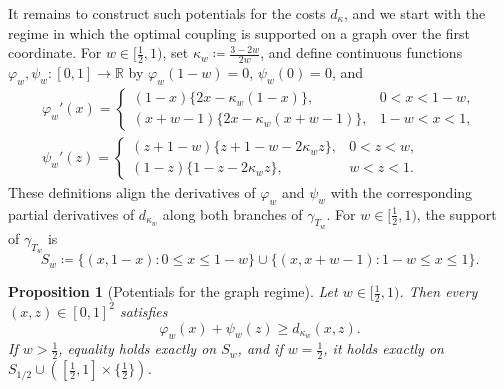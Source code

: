 \documentclass[11pt,a4paper]{article}
\newtheorem{proposition}[theorem]{Proposition}
\theoremstyle{remark}
\newcommand{\R}{\mathbb{R}}
\newcommand{\1}{\mathbf{1}}
\begin{document}
It remains to construct such potentials for the costs $d_\kappa$, and we start with the regime in which the optimal coupling is supported on a graph over the first coordinate.
For $w\in[\frac12,1)$, set $\kappa_w\coloneqq\frac{3-2w}{2w}$, and define continuous functions $\varphi_w,\psi_w:[0,1]\to\R$ by $\varphi_w(1-w)=0$, $\psi_w(0)=0$, and
\begin{equation}
  \label{eq:potential-A}
  \begin{gathered}
  \varphi_w'(x)=
  \begin{cases}
    (1-x)\bigl\{2x-\kappa_w(1-x)\bigr\}, & 0<x<1-w,\\
    (x+w-1)\bigl\{2x-\kappa_w(x+w-1)\bigr\}, & 1-w<x<1,
  \end{cases}\\[0.5ex]
  \psi_w'(z)=
  \begin{cases}
    (z+1-w)\bigl\{z+1-w-2\kappa_wz\bigr\}, & 0<z<w,\\
    (1-z)\bigl\{1-z-2\kappa_wz\bigr\}, & w<z<1.
  \end{cases}
  \end{gathered}
\end{equation}
These definitions align the derivatives of $\varphi_w$ and $\psi_w$ with the corresponding partial derivatives of $d_{\kappa_w}$ along both branches of $\gamma_{T_w}$.
For $w\in[\frac12,1)$, the support of $\gamma_{T_w}$ is
\[
  S_w\coloneqq\{(x,1-x):0\le x\le1-w\}
       \cup\{(x,x+w-1):1-w\le x\le1\}.
\]

\begin{proposition}[Potentials for the graph regime]
\label{prop:dual-A}
Let $w\in[\frac12,1)$.
Then every $(x,z)\in[0,1]^2$ satisfies
\begin{equation}
  \label{eq:dual-A-inequality}
  \varphi_w(x)+\psi_w(z)\ge d_{\kappa_w}(x,z).
\end{equation}
If $w>\frac12$, equality holds exactly on $S_w$, and if $w=\frac12$, it holds exactly on $S_{1/2}\cup([\frac12,1]\times\{\frac12\})$.
\end{proposition}
\end{document}

